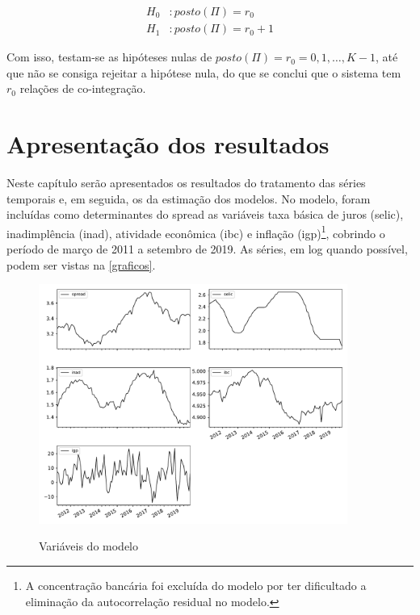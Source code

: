 \documentclass[a4paper,
               article,
               12pt,
               openany,
               oneside,
               english,
               brazil]{abntex2}
\numberwithin{equation}{section}
\begin{document}
   \begin{equation}
       \label{maxeig}
       \begin{aligned}
           H_0&: posto(\Pi) = r_0 \\
           H_1&: posto(\Pi) = r_0 + 1
       \end{aligned}
   \end{equation}

   Com isso, testam-se as hipóteses nulas de $ posto(\Pi) = r_0 = 0, 1, \dots, K-1 $, até que não se consiga rejeitar a hipótese nula, do que se conclui que o sistema tem $ r_0 $ relações de co-integração.

   \section{Apresentação dos resultados}

   Neste capítulo serão apresentados os resultados do tratamento das séries temporais e, em seguida, os da estimação dos modelos. No modelo, foram incluídas como determinantes do spread as variáveis taxa básica de juros (selic), inadimplência (inad), atividade econômica (ibc) e inflação (igp)\footnote{A concentração bancária foi excluída do modelo por ter dificultado a eliminação da autocorrelação residual no modelo.}, cobrindo o período de março de 2011 a setembro de 2019. As séries, em log quando possível, podem ser vistas na \autoref{graficos}.

    \begin{figure}[h]
        \centering
        \caption{Variáveis do modelo}
        \includegraphics[width = 0.9\textwidth, scale=1]{series_modelo.pdf}
        \label{graficos}
    \end{figure}
\end{document}
